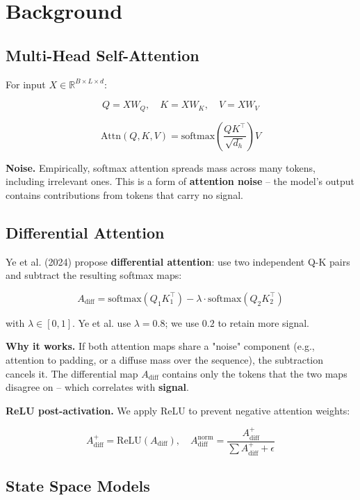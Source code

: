\section{Background}

\subsection{Multi-Head Self-Attention}

For input $X \in \mathbb{R}^{B \times L \times d}$:

\[
Q = X W_Q, \quad K = X W_K, \quad V = X W_V
\tag{3.1}
\]

\[
\text{Attn}(Q, K, V) = \text{softmax}\!\left(\frac{Q K^\top}{\sqrt{d_h}}\right) V
\tag{3.2}
\]

\textbf{Noise.} Empirically, softmax attention spreads mass across many tokens, 
including irrelevant ones. This is a form of \textbf{attention noise} -- the 
model's output contains contributions from tokens that carry no signal.

\subsection{Differential Attention}

Ye et al. (2024) propose \textbf{differential attention}: use two independent 
Q-K pairs and subtract the resulting softmax maps:

\[
A_\text{diff} = \text{softmax}(Q_1 K_1^\top) - \lambda \cdot \text{softmax}(Q_2 K_2^\top)
\tag{3.3}
\]

with $\lambda \in [0, 1]$. Ye et al. use $\lambda = 0.8$; we use $0.2$ to 
retain more signal.

\textbf{Why it works.} If both attention maps share a "noise" component (e.g., 
attention to padding, or a diffuse mass over the sequence), the subtraction 
cancels it. The differential map $A_\text{diff}$ contains only the tokens 
that the two maps disagree on -- which correlates with \textbf{signal}.

\textbf{ReLU post-activation.} We apply ReLU to prevent negative attention 
weights:

\[
A_\text{diff}^+ = \text{ReLU}(A_\text{diff}), \quad
A_\text{diff}^\text{norm} = \frac{A_\text{diff}^+}{\sum A_\text{diff}^+ + \epsilon}
\tag{3.4}
\]

\subsection{State Space Models}

